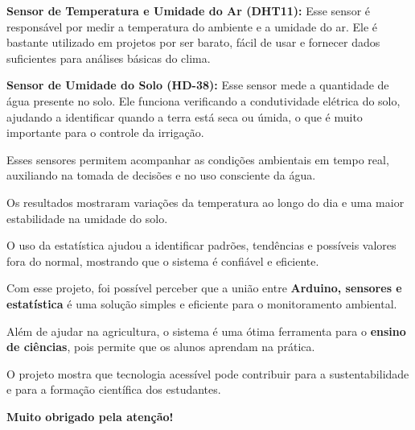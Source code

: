 \documentclass[12pt]{article}
\begin{document}
\begin{tcolorbox}[colback=orange!5,colframe=laranja,title=\textbf{Sensores Utilizados}]
\textbf{Sensor de Temperatura e Umidade do Ar (DHT11):}
Esse sensor é responsável por medir a temperatura do ambiente e a umidade do ar. Ele é bastante utilizado em projetos por ser barato, fácil de usar e fornecer dados suficientes para análises básicas do clima.

\textbf{Sensor de Umidade do Solo (HD-38):}
Esse sensor mede a quantidade de água presente no solo. Ele funciona verificando a condutividade elétrica do solo, ajudando a identificar quando a terra está seca ou úmida, o que é muito importante para o controle da irrigação.

Esses sensores permitem acompanhar as condições ambientais em tempo real, auxiliando na tomada de decisões e no uso consciente da água.
\end{tcolorbox}

\begin{tcolorbox}[colback=blue!5,colframe=azul,title=\textbf{Resultados}]
Os resultados mostraram variações da temperatura ao longo do dia e uma maior estabilidade na umidade do solo.

O uso da estatística ajudou a identificar padrões, tendências e possíveis valores fora do normal, mostrando que o sistema é confiável e eficiente.
\end{tcolorbox}

\begin{tcolorbox}[colback=green!5,colframe=verde,title=\textbf{Conclusão}]
Com esse projeto, foi possível perceber que a união entre \textbf{Arduino, sensores e estatística} é uma solução simples e eficiente para o monitoramento ambiental.

Além de ajudar na agricultura, o sistema é uma ótima ferramenta para o \textbf{ensino de ciências}, pois permite que os alunos aprendam na prática.

O projeto mostra que tecnologia acessível pode contribuir para a sustentabilidade e para a formação científica dos estudantes.

\textbf{Muito obrigado pela atenção!}
\end{tcolorbox}
\end{document}
